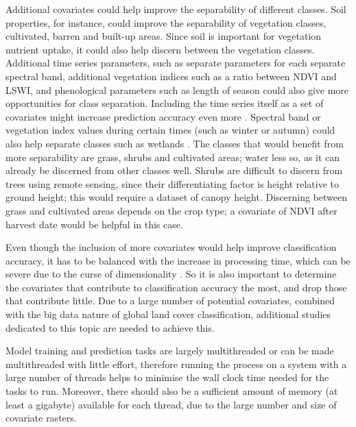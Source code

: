 \documentclass[a4paper,12pt]{scrbook}
\begin{document}
Additional covariates could help improve the separability of different classes. Soil properties, for instance, could improve the separability of vegetation classes, cultivated, barren and built-up areas. Since soil is important for vegetation nutrient uptake, it could also help discern between the vegetation classes. Additional time series parameters, such as separate parameters for each separate spectral band, additional vegetation indices such as a ratio between NDVI and LSWI, and phenological parameters such as length of season could also give more opportunities for class separation. Including the time series itself as a set of covariates might increase prediction accuracy even more \citep{Pelletier2016hardrf}. Spectral band or vegetation index values during certain times (such as winter or autumn) could also help separate classes such as wetlands \citep{davranche2010wetland}. The classes that would benefit from more separability are grass, shrubs and cultivated areas; water less so, as it can already be discerned from other classes well. Shrubs are difficult to discern from trees using remote sensing, since their differentiating factor is height relative to ground height; this would require a dataset of canopy height. Discerning between grass and cultivated areas depends on the crop type; a covariate of NDVI after harvest date would be helpful in this case.

Even though the inclusion of more covariates would help improve classification accuracy, it has to be balanced with the increase in processing time, which can be severe due to the curse of dimensionality \citep{Pelletier2016hardrf}. So it is also important to determine the covariates that contribute to classification accuracy the most, and drop those that contribute little. Due to a large number of potential covariates, combined with the big data nature of global land cover classification, additional studies dedicated to this topic are needed to achieve this.

Model training and prediction tasks are largely multithreaded or can be made multithreaded with little effort, therefore running the process on a system with a large number of threads helps to minimise the wall clock time needed for the tasks to run. Moreover, there should also be a sufficient amount of memory (at least a gigabyte) available for each thread, due to the large number and size of covariate rasters.
\end{document}

